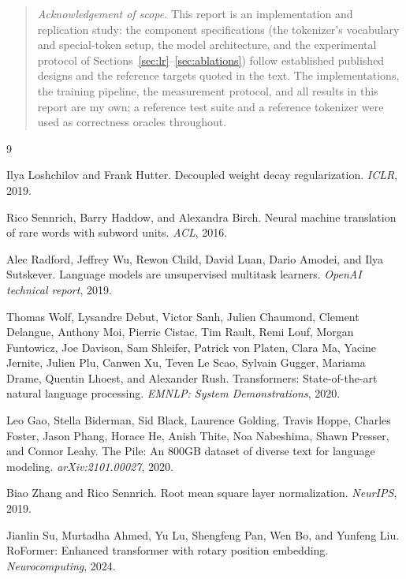 \documentclass{article}
\begin{document}
\begin{quote}
\small \emph{Acknowledgement of scope.} This report is an implementation and replication study: the component specifications (the tokenizer's vocabulary and special-token setup, the model architecture, and the experimental protocol of Sections~\ref{sec:lr}--\ref{sec:ablations}) follow established published designs and the reference targets quoted in the text. The implementations, the training pipeline, the measurement protocol, and all results in this report are my own; a reference test suite and a reference tokenizer were used as correctness oracles throughout.
\end{quote}

\begin{thebibliography}{9}

Ilya Loshchilov and Frank Hutter.
\newblock Decoupled weight decay regularization.
\newblock \emph{ICLR}, 2019.

Rico Sennrich, Barry Haddow, and Alexandra Birch.
\newblock Neural machine translation of rare words with subword units.
\newblock \emph{ACL}, 2016.

Alec Radford, Jeffrey Wu, Rewon Child, David Luan, Dario Amodei, and Ilya Sutskever.
\newblock Language models are unsupervised multitask learners.
\newblock \emph{OpenAI technical report}, 2019.

Thomas Wolf, Lysandre Debut, Victor Sanh, Julien Chaumond, Clement Delangue, Anthony Moi, Pierric Cistac, Tim Rault, Remi Louf, Morgan Funtowicz, Joe Davison, Sam Shleifer, Patrick von Platen, Clara Ma, Yacine Jernite, Julien Plu, Canwen Xu, Teven Le Scao, Sylvain Gugger, Mariama Drame, Quentin Lhoest, and Alexander Rush.
\newblock Transformers: State-of-the-art natural language processing.
\newblock \emph{EMNLP: System Demonstrations}, 2020.

Leo Gao, Stella Biderman, Sid Black, Laurence Golding, Travis Hoppe, Charles Foster, Jason Phang, Horace He, Anish Thite, Noa Nabeshima, Shawn Presser, and Connor Leahy.
\newblock The Pile: An 800GB dataset of diverse text for language modeling.
\newblock \emph{arXiv:2101.00027}, 2020.

Biao Zhang and Rico Sennrich.
\newblock Root mean square layer normalization.
\newblock \emph{NeurIPS}, 2019.

Jianlin Su, Murtadha Ahmed, Yu Lu, Shengfeng Pan, Wen Bo, and Yunfeng Liu.
\newblock RoFormer: Enhanced transformer with rotary position embedding.
\newblock \emph{Neurocomputing}, 2024.


\end{thebibliography}
\end{document}
